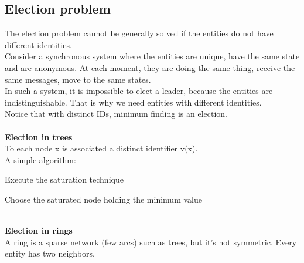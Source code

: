\documentclass[paper=a4, fontsize=11pt]{scrartcl} %
\numberwithin{equation}{section} %
\numberwithin{figure}{section} %
\numberwithin{table}{section} %
\begin{document}
\subsection*{Election problem}
The election problem cannot be generally solved if the entities do not have different identities.\\
Consider a synchronous system where the entities are unique, have the same state and are anonymous.
At each moment, they are doing the same thing, receive the same messages, move to the same states.\\ In such a system, it is impossible to elect a leader, because the entities are indistinguishable. That is why we need entities with different identities.\\
Notice that with distinct IDs, minimum finding is an election.
\\ ~ \\
\textbf{Election in trees}\\
To each node x is associated a distinct identifier v(x). \\ A simple algorithm:
\begin{compactitem}
\item Execute the saturation technique
\item Choose the saturated node holding the minimum value
\end{compactitem} ~ \\ 
\textbf{Election in rings}\\
A ring is a sparse network (few arcs) such as trees, but it's not symmetric. Every entity has two neighbors.
\clearpage
\end{document}
